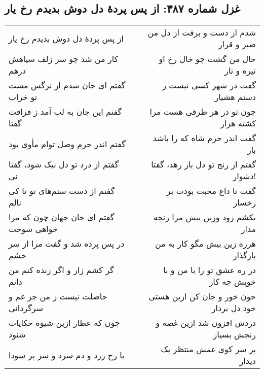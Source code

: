 \begin{center}
\section*{غزل شماره ۳۸۷: از پس پردهٔ دل دوش بدیدم رخ یار}
\label{sec:387}
\begin{longtable}{l p{0.5cm} r}
از پس پردهٔ دل دوش بدیدم رخ یار
&&
شدم از دست و برفت از دل من صبر و قرار
\\
کار من شد چو سر زلف سیاهش درهم
&&
حال من گشت چو خال رخ او تیره و تار
\\
گفتم ای جان شدم از نرگس مست تو خراب
&&
گفت در شهر کسی نیست ز دستم هشیار
\\
گفتم این جان به لب آمد ز فراقت گفتا
&&
چون تو در هر طرفی هست مرا کشته هزار
\\
گفتم اندر حرم وصل توام مأوی بود
&&
گفت اندر حرم شاه که را باشد بار
\\
گفتم از درد تو دل نیک شود، گفتا نی
&&
گفتم از رنج تو دل باز رهد، گفتا دشوار!
\\
گفتم از دست ستم‌های تو تا کی نالم
&&
گفت تا داغ محبت بودت بر رخسار
\\
گفتم ای جان جهان چون که مرا خواهی سوخت
&&
بکشم زود وزین بیش مرا رنجه مدار
\\
در پس پرده شد و گفت مرا از سر خشم
&&
هرزه زین بیش مگو کار به من بازگذار
\\
گر کشم زار و اگر زنده کنم من دانم
&&
در ره عشق تو را با من و با خویش چه کار
\\
حاصلت نیست ز من جز غم و سرگردانی
&&
خون خور و جان کن ازین هستی خود دل بردار
\\
چون که عطار ازین شیوه حکایات شنود
&&
دردش افزون شد ازین غصه و رنجش بسیار
\\
با رخ زرد و دم سرد و سر پر سودا
&&
بر سر کوی غمش منتظر یک دیدار
\\
\end{longtable}
\end{center}
